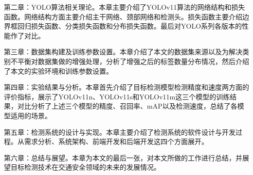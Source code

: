 第二章：YOLO算法相关理论。本章主要介绍了YOLOv11算法的网络结构和损失函数。网络结构方面主要介绍主干网络、颈部网络和检测头。损失函数主要介绍边界框回归损失函数、分类损失函数和分布损失函数。最后对YOLO系列各版本的性能作了对比。

第三章：数据集构建及训练参数设置。本章介绍了本文的数据集来源以及为解决类别不平衡对数据集做的增强处理，分析了增强之后的标签数量分布情况，然后介绍了本文的实验环境和训练参数设置。

第四章：实验结果与分析。本章首先介绍了目标检测模型检测精度和速度两方面的评价指标，展示了YOLOv11n、YOLOv11s和YOLOv11m这三个模型的训练结果，对比分析了上述三个模型的精度、召回率、mAP以及检测速度，总结了各模型适用的场景。

第五章：检测系统的设计与实现。本章主要介绍了检测系统的软件设计与开发过程。从需求分析、系统架构、前端开发和后端开发这四个方面展开。

第六章：总结与展望。本章为本文的最后一张，对本文所做的工作进行总结，并展望目标检测技术在交通安全领域的未来的发展情况。
